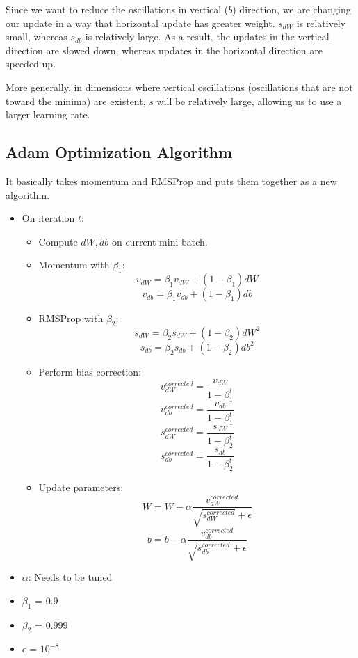 Since we want to reduce the oscillations in vertical ($b$) direction, we are changing our update in a way that horizontal update has greater weight. $s_{dW}$ is relatively small, whereas $s_{db}$ is relatively large. As a result, the updates in the vertical direction are slowed down, whereas updates in the horizontal direction are speeded up. 

More generally, in dimensions where vertical oscillations (oscillations that are not toward the minima) are existent, $s$ will be relatively large, allowing us to use a larger learning rate. 


\subsection{Adam Optimization Algorithm}
It basically takes momentum and RMSProp and puts them together as a new algorithm. 

\begin{itemize} 
    \item On iteration $t$:
    \begin{itemize}
        \item[] Compute $dW, db$ on current mini-batch.
        \item[] Momentum with $\beta_1$: $$v_{dW} = \beta_1 v_{dW} + (1-\beta_1)dW$$ $$v_{db} = \beta_1 v_{db} + (1-\beta_1)db$$
        \item[] RMSProp with $\beta_2$: $$s_{dW} = \beta_2 s_{dW} + (1-\beta_2)dW^2$$ $$s_{db} = \beta_2 s_{db} + (1-\beta_2)db^2$$
        \item[] Perform bias correction: 
        $$v^{corrected}_{dW} = \frac{v_{dW}}{1-\beta_1^t}$$ 
        $$v^{corrected}_{db} = \frac{v_{db}}{1-\beta_1^t}$$ 
        $$s^{corrected}_{dW} = \frac{s_{dW}}{1-\beta_2^t}$$ 
        $$s^{corrected}_{db} = \frac{s_{db}}{1-\beta_2^t}$$ 
        \item[] Update parameters: 
        $$W = W - \alpha\frac{v^{corrected}_{dW}}{\sqrt{s^{corrected}_{dW}} + \epsilon}$$ 
        $$b = b - \alpha\frac{v^{corrected}_{db}}{\sqrt{s^{corrected}_{db}} + \epsilon}$$ 
    \end{itemize}
\end{itemize}

\begin{itemize}
    \item $\alpha$: Needs to be tuned
    \item $\beta_1$ = $0.9$
    \item $\beta_2$ = $0.999$
    \item $\epsilon$ = $10^{-8}$
\end{itemize}

